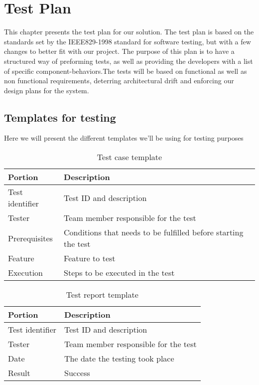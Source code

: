 \chapter{Test Plan}

This chapter presents the test plan for our solution. The test plan is based on  the standards set by the IEEE829-1998 standard for software testing, but with a few changes to better fit with our project. The purpose of this plan is to have a structured way of preforming tests, as well as providing the developers with a list of specific component-behaviors.The tests will be based on functional as well as non functional requirements, deterring architectural drift and enforcing our design plans for the system.

\section{Templates for testing}

Here we will present the different templates we'll be using for testing purposes\\

\begin{table}[H]
\caption{Test case template}
\begin{tabular}{l l}
\hline\hline
Portion & Description\\[0.5ex]
\hline
Test identifier & Test ID and description\\[0.5ex]
Tester & Team member responsible for the test\\[0.5ex]
Prerequisites & Conditions that needs to be fulfilled before starting the test\\[0.5ex]
Feature & Feature to test\\[0.5ex]
Execution & Steps to be executed in the test\\[0.5ex]
\hline\hline
\end{tabular}
\end{table}

\begin{table}[H]
\caption{Test report template}
\begin{tabular}{l l}
\hline\hline
Portion & Description\\[0.5ex]
\hline
Test identifier & Test ID and description\\[0.5ex]
Tester & Team member responsible for the test\\[0.5ex]
Date & The date the testing took place\\[0.5ex]
Result & Success \\[0.5ex]
\hline\hline
\end{tabular}
\end{table}

